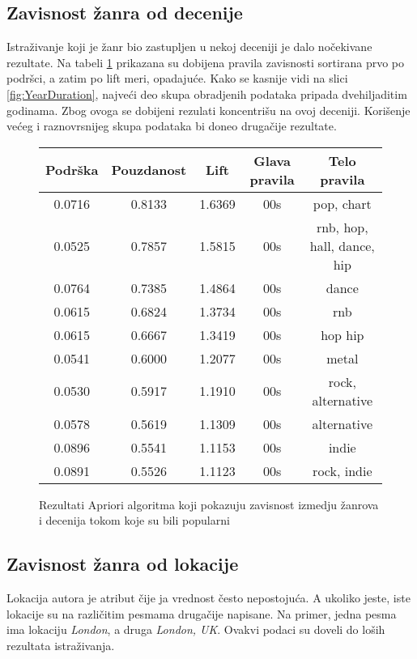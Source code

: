 \subsection{Zavisnost \v{z}anra od decenije}
\label{subsec:AprioriZavisnostZanraOdDecenije}

Istra\v{z}ivanje koji je \v{z}anr bio zastupljen u nekoj deceniji je dalo no\v{c}ekivane rezultate. Na tabeli \ref{fig:aprioriDecade} prikazana su dobijena pravila zavisnosti sortirana prvo po podr\v{s}ci, a zatim po lift meri, opadaju\'c{}e.
Kako se kasnije vidi na slici \ref{fig:YearDuration}, najve\'c{}i deo skupa obradjenih podataka pripada dvehiljaditim godinama. Zbog ovoga se dobijeni rezulati koncentri\v{s}u na ovoj deceniji. Kori\v{s}enje ve\'c{}eg i raznovrsnijeg skupa podataka bi doneo druga\v{c}ije rezultate.

\begin{figure}[H]
    \footnotesize
    \centering
    \begin{tabular}{|c|c|c|c|c|}
        \hline
        Podr\v{s}ka & Pouzdanost & Lift & Glava pravila  & Telo pravila \\
        \hline
        0.0716 & 0.8133 & 1.6369 & 00s & pop, chart \\
        0.0525 & 0.7857 & 1.5815 & 00s & rnb, hop, hall, dance, hip \\
        0.0764 & 0.7385 & 1.4864 & 00s & dance \\
        0.0615 & 0.6824 & 1.3734 & 00s & rnb \\
        0.0615 & 0.6667 & 1.3419 & 00s & hop hip \\
        0.0541 & 0.6000 & 1.2077 & 00s & metal \\
        0.0530 & 0.5917 & 1.1910 & 00s & rock, alternative \\
        0.0578 & 0.5619 & 1.1309 & 00s & alternative \\
        0.0896 & 0.5541 & 1.1153 & 00s & indie \\
        0.0891 & 0.5526 & 1.1123 & 00s & rock, indie \\
        \hline
    \end{tabular}
    \caption{Rezultati Apriori algoritma koji pokazuju zavisnost izmedju \v{z}anrova i decenija tokom koje su bili popularni}
    \label{fig:aprioriDecade}
\end{figure}


\subsection{Zavisnost \v{z}anra od lokacije}
\label{subsec:AprioriZavisnostZanraOdLokacije}

Lokacija autora je atribut \v{c}ije ja vrednost \v{c}esto nepostoju\'c{}a. A ukoliko jeste, iste lokacije su na razli\v{c}itim pesmama druga\v{c}ije napisane. Na primer, jedna pesma ima lokaciju \emph{London}, a druga \emph{London, UK}. Ovakvi podaci su doveli do lo\v{s}ih rezultata istra\v{z}ivanja.
